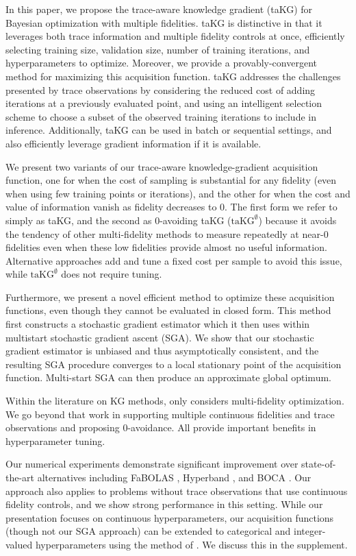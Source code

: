 \documentclass[letterpaper]{article}
\newcommand{\taKGE}{\text{taKG}^\emptyset}
\numberwithin{equation}{section}
\begin{document}
In this paper, we propose the trace-aware knowledge gradient (taKG) for Bayesian optimization with multiple fidelities. taKG is distinctive in that it leverages both trace information and multiple fidelity controls at once, efficiently selecting training size, validation size, number of training iterations, and hyperparameters to optimize. Moreover, we provide a provably-convergent method for maximizing this acquisition function.
taKG addresses the challenges presented by trace observations by considering the reduced cost of adding iterations at a previously evaluated point, and using an intelligent selection scheme to choose a subset of the observed training iterations to include in inference.
Additionally, taKG can be used in batch or sequential settings, and also efficiently leverage gradient information if it is available.

We present two variants of our trace-aware knowledge-gradient acquisition function, one for when the cost of sampling is substantial for any fidelity (even when using few training points or iterations), and the other for when the cost and value of information vanish as fidelity decreases to 0.  The first form we refer to simply as taKG, and the second as 0-avoiding taKG ($\taKGE$) because it avoids the tendency of other multi-fidelity methods to measure repeatedly at near-0 fidelities even when these low fidelities provide almost no useful information.  Alternative approaches \citep{mcleod2017practical,klein2016fast} add and tune a fixed cost per sample to avoid this issue, while $\taKGE$ does not require tuning. 

Furthermore, we present a novel efficient method to optimize these acquisition functions, even though they cannot be evaluated in closed form.
 This method first constructs a stochastic gradient estimator which it then uses within multistart stochastic gradient ascent (SGA). We show that our stochastic gradient estimator is unbiased and thus asymptotically consistent, and the resulting SGA procedure converges to a local stationary point of the acquisition function.
Multi-start SGA can then produce an approximate global optimum.

Within the literature on KG methods, only \cite{poloczek2016multi} considers multi-fidelity optimization.  
We go beyond that work in supporting multiple continuous fidelities and trace observations and proposing 0-avoidance. All provide important benefits in hyperparameter tuning.

Our numerical experiments demonstrate significant improvement over state-of-the-art alternatives including FaBOLAS \citep{klein2016fast,klein2015towards}, Hyperband \citep{li2016hyperband}, and 
BOCA \citep{kandasamy2017multi}. Our approach also applies to problems without trace observations that use continuous fidelity controls, and we show strong performance in this setting.
While our presentation focuses on continuous hyperparameters, 
our acquisition functions (though not our SGA approach) can be extended to categorical and integer-valued hyperparameters using the method of \cite{garrido2018dealing}.  We discuss this in the supplement.
\end{document}
